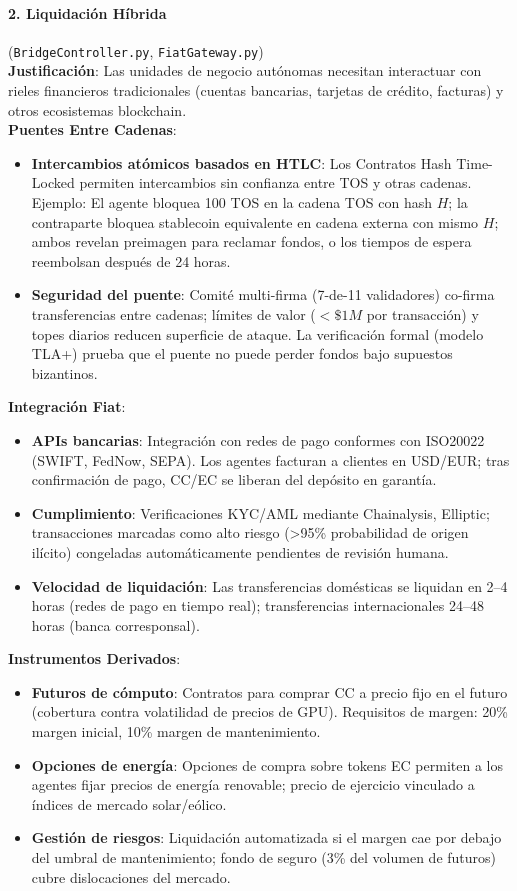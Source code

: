 \documentclass[11pt]{article}
\begin{document}
\paragraph{2. Liquidación Híbrida} (\texttt{BridgeController.py}, \texttt{FiatGateway.py})\\
\textbf{Justificación}: Las unidades de negocio autónomas necesitan interactuar con rieles financieros tradicionales (cuentas bancarias, tarjetas de crédito, facturas) y otros ecosistemas blockchain.\\
\textbf{Puentes Entre Cadenas}:
\begin{itemize}[noitemsep]
  \item \textbf{Intercambios atómicos basados en HTLC}: Los Contratos Hash Time-Locked permiten intercambios sin confianza entre TOS y otras cadenas. Ejemplo: El agente bloquea 100 TOS en la cadena TOS con hash $H$; la contraparte bloquea stablecoin equivalente en cadena externa con mismo $H$; ambos revelan preimagen para reclamar fondos, o los tiempos de espera reembolsan después de 24 horas.
  \item \textbf{Seguridad del puente}: Comité multi-firma (7-de-11 validadores) co-firma transferencias entre cadenas; límites de valor ($<\$1M$ por transacción) y topes diarios reducen superficie de ataque. La verificación formal (modelo TLA+) prueba que el puente no puede perder fondos bajo supuestos bizantinos.
\end{itemize}
\textbf{Integración Fiat}:
\begin{itemize}[noitemsep]
  \item \textbf{APIs bancarias}: Integración con redes de pago conformes con ISO20022 (SWIFT, FedNow, SEPA). Los agentes facturan a clientes en USD/EUR; tras confirmación de pago, CC/EC se liberan del depósito en garantía.
  \item \textbf{Cumplimiento}: Verificaciones KYC/AML mediante Chainalysis, Elliptic; transacciones marcadas como alto riesgo (>95\% probabilidad de origen ilícito) congeladas automáticamente pendientes de revisión humana.
  \item \textbf{Velocidad de liquidación}: Las transferencias domésticas se liquidan en 2--4 horas (redes de pago en tiempo real); transferencias internacionales 24--48 horas (banca corresponsal).
\end{itemize}
\textbf{Instrumentos Derivados}:
\begin{itemize}[noitemsep]
  \item \textbf{Futuros de cómputo}: Contratos para comprar CC a precio fijo en el futuro (cobertura contra volatilidad de precios de GPU). Requisitos de margen: 20\% margen inicial, 10\% margen de mantenimiento.
  \item \textbf{Opciones de energía}: Opciones de compra sobre tokens EC permiten a los agentes fijar precios de energía renovable; precio de ejercicio vinculado a índices de mercado solar/eólico.
  \item \textbf{Gestión de riesgos}: Liquidación automatizada si el margen cae por debajo del umbral de mantenimiento; fondo de seguro (3\% del volumen de futuros) cubre dislocaciones del mercado.
\end{itemize}
\end{document}
